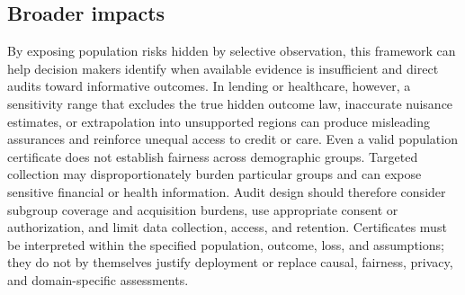 \subsection{Broader impacts}
\label{app:broader-impacts}

By exposing population risks hidden by selective observation, this framework can help decision makers identify when available evidence is insufficient and direct audits toward informative outcomes. In lending or healthcare, however, a sensitivity range that excludes the true hidden outcome law, inaccurate nuisance estimates, or extrapolation into unsupported regions can produce misleading assurances and reinforce unequal access to credit or care. Even a valid population certificate does not establish fairness across demographic groups. Targeted collection may disproportionately burden particular groups and can expose sensitive financial or health information. Audit design should therefore consider subgroup coverage and acquisition burdens, use appropriate consent or authorization, and limit data collection, access, and retention. Certificates must be interpreted within the specified population, outcome, loss, and assumptions; they do not by themselves justify deployment or replace causal, fairness, privacy, and domain-specific assessments.
\FloatBarrier
